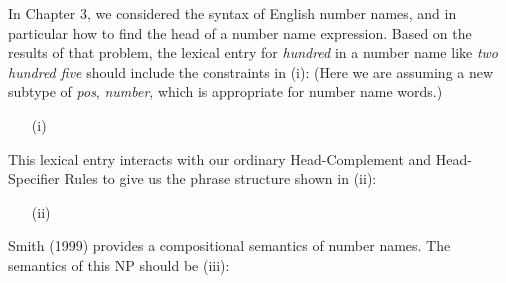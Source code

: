 \documentclass[a4paper,landscape,headrule,footrule]{foils}
\begin{document}
In  Chapter 3, we considered the
syntax of English number names, and in particular how
to find the head of a number name expression. Based on the
results of that problem, the lexical entry for
{\it hundred} in a number name like {\it two hundred five}
should include the constraints in (i): (Here we are assuming
a new subtype of {\it pos}, {\it number}, which is appropriate
for number name words.)

\begin{itemize}
\item[(i)] 
\end{itemize}

\noindent
This lexical entry interacts with our ordinary Head-Complement
and Head-Specifier Rules to give us the phrase structure shown in
(ii):

\begin{itemize}
\item[(ii)] 
\end{itemize}

Smith (1999) provides a compositional semantics
of number names. The semantics of this NP should be (iii):
\end{document}

